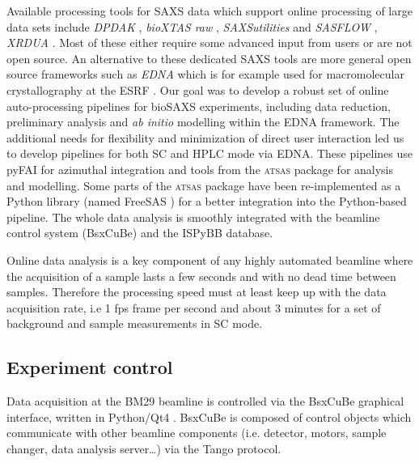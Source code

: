 \documentclass[preprint,pdf]{iucr}              %
\begin{document}
Available processing tools for SAXS data which support online processing of
large data sets include \textit{DPDAK} \cite{DPDAK}, \textit{bioXTAS raw}
\cite{BioXTASraw}, \textit{SAXSutilities} \cite{SAXSUtilities} and
\textit{SASFLOW} \cite{X33P,P12},  \textit{XRDUA} \cite{xrdua}. 
Most of these either require some advanced input from users or are not open source.
An alternative to these dedicated SAXS tools are more general open source frameworks such as
\textit{EDNA} which is for example used for macromolecular crystallography at
the ESRF \cite{EDNA}.
Our goal was to develop a robust set of online auto-processing pipelines
for bioSAXS experiments, including data reduction, preliminary analysis and
\textit{ab initio} modelling  within the EDNA framework.
The additional needs for flexibility and minimization of
direct user interaction led us to develop pipelines for both SC and HPLC mode
via EDNA.
These pipelines use pyFAI for azimuthal integration \cite{pyFAI} and tools
from the \textsc{atsas} package \cite{ATSAS1,ATSAS2} for analysis and modelling.
Some parts of the \textsc{atsas} package have been re-implemented as a Python
library (named FreeSAS \cite{freesas}) for a better integration into the
Python-based pipeline.
The whole data analysis is smoothly integrated with the beamline control system
(BsxCuBe) and the ISPyBB \cite{ISPYBB} database.


Online data analysis is a key component of any highly automated beamline
where the acquisition of a sample lasts a few seconds and with no dead time
between samples.
Therefore the processing speed must at least keep up with the data acquisition
rate, i.e 1 fps frame per second and about 3 minutes for a set of background and
sample measurements in SC mode.


\subsection{Experiment control}
Data acquisition at the BM29 beamline is controlled via the BsxCuBe
graphical interface, written in Python/Qt4 \cite{pyqt}.
BsxCuBe is composed of control objects which communicate with other beamline
components (i.e. detector, motors, sample changer, data analysis server\ldots)
via the Tango protocol\cite{tango}.


\end{document}
